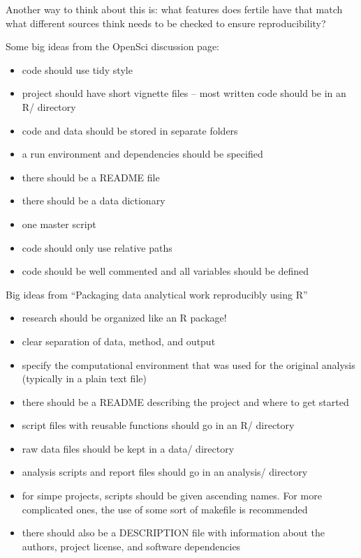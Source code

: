 \documentclass[12pt]{article}
\providecommand{\tightlist}{%
  \setlength{\itemsep}{0pt}\setlength{\parskip}{0pt}}
\begin{document}
Another way to think about this is: what features does fertile have that
match what different sources think needs to be checked to ensure
reproducibility?

Some big ideas from the OpenSci discussion page:

\begin{itemize}
\tightlist
\item
  code should use tidy style
\item
  project should have short vignette files -- most written code should
  be in an R/ directory
\item
  code and data should be stored in separate folders
\item
  a run environment and dependencies should be specified
\item
  there should be a README file
\item
  there should be a data dictionary
\item
  one master script
\item
  code should only use relative paths
\item
  code should be well commented and all variables should be defined
\end{itemize}

Big ideas from ``Packaging data analytical work reproducibly using R''

\begin{itemize}
\tightlist
\item
  research should be organized like an R package!
\item
  clear separation of data, method, and output
\item
  specify the computational environment that was used for the original
  analysis (typically in a plain text file)
\item
  there should be a README describing the project and where to get
  started
\item
  script files with reusable functions should go in an R/ directory
\item
  raw data files should be kept in a data/ directory
\item
  analysis scripts and report files should go in an analysis/ directory
\item
  for simpe projects, scripts should be given ascending names. For more
  complicated ones, the use of some sort of makefile is recommended
\item
  there should also be a DESCRIPTION file with information about the
  authors, project license, and software dependencies
\end{itemize}
\end{document}

